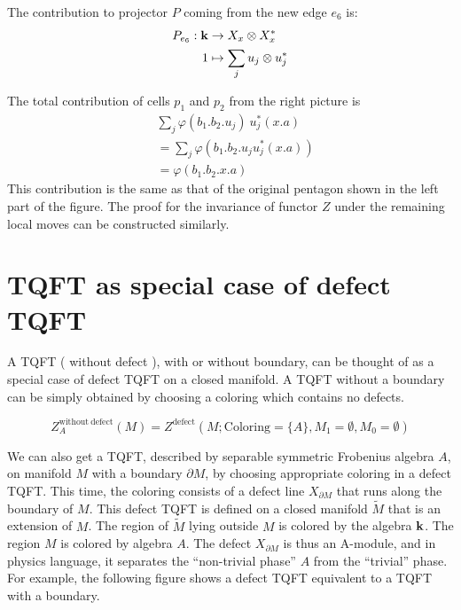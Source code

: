 \begin{defectfiguresetup}
The contribution to projector $P$ coming from the new edge $e_6$ is:
\begin{align*}
	P_{e_6}: \mathbf{k} &\rightarrow X_x \otimes X_x^*\\
	1 &\mapsto  \sum_j u_j \otimes u_j^*\\
\end{align*}

The total contribution of cells $p_1$ and $p_2$ from the right picture is
\begin{align*}
	& \sum_{j} \varphi(b_1.b_2.u_j)\ u_j^{*}(x.a)\\
	& =\sum_{j} \varphi(b_1.b_2.u_j u_j^{*}(x.a) )\\
	& =\varphi(b_1.b_2.x.a)
\end{align*}
This contribution is the same as that of the original pentagon shown in the left part of the figure. The proof for the invariance of functor $Z$ under the remaining local moves can be constructed similarly.


\section{TQFT as special case of defect TQFT}\label{s:tqft-as-dtqft}
A TQFT ( without defect ), with or without boundary, can be thought of as a special case of defect TQFT on a closed manifold. A TQFT without a boundary can be simply obtained by choosing a coloring which contains no defects.

\begin{equation}
	Z^{\mathrm{without\ defect}}_{A} (M) = Z^{\mathrm{defect}} (M; \mathrm{Coloring}={\{A\} ,M_1= \emptyset,M_0=\emptyset})
\end{equation}

We can also get a TQFT, described by separable symmetric Frobenius algebra $A$, on manifold $M$ with a boundary $\partial M$, by choosing appropriate coloring in a defect TQFT. This time, the coloring consists of a defect line $X_{\partial M}$ that runs along the boundary of $M$. This defect TQFT is defined on a closed manifold $\widetilde{M}$ that is an extension of $M$. The region of $\widetilde{M}$ lying outside $M$ is colored by the algebra $\mathbf{k}$. The region $M$ is colored by algebra $A$. The defect $X_{\partial M}$ is thus an A-module, and in physics language, it separates the ``non-trivial phase'' $A$ from the ``trivial'' phase. For example, the following figure shows a defect TQFT equivalent to a TQFT with a boundary.



\end{defectfiguresetup}
